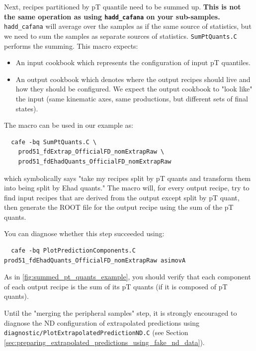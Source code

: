 \documentclass{article}
\begin{document}
Next, recipes partitioned by pT quantile need to be summed up. \textbf{This is not the same operation as using \texttt{hadd\_cafana} on your sub-samples.} \texttt{hadd\_cafana} will average over the samples as if the same source of statistics, but we need to sum the samples as separate sources of statistics.
\texttt{SumPtQuants.C} performs the summing. This macro expects:
\begin{itemize}
  \item An input cookbook which represents the configuration of input pT quantiles.
  \item An output cookbook which denotes where the output recipes should live and how they should be configured. We expect the output cookbook to "look like" the input (same kinematic axes, same productions, but different sets of final states).
\end{itemize}
The macro can be used in our example as:
\begin{verbatim}
  cafe -bq SumPtQuants.C \
    prod51_fdExtrap_OfficialFD_nomExtrapRaw \
    prod51_fdEhadQuants_OfficialFD_nomExtrapRaw
\end{verbatim}
which symbolically says "take my recipes split by pT quants and transform them into being split by Ehad quants." The macro will, for every output recipe, try to find input recipes that are derived from the output except split by pT quant, then generate the ROOT file for the output recipe using the sum of the pT quants.

You can diagnose whether this step succeeded using:
\begin{verbatim}
  cafe -bq PlotPredictionComponents.C prod51_fdEhadQuants_OfficialFD_nomExtrapRaw asimovA
\end{verbatim}
As in \ref{fig:summed_pt_quants_example}, you should verify that each component of each output recipe is the sum of its pT quants (if it is composed of pT quants).

Until the "merging the peripheral samples" step, it is strongly encouraged to diagnose the ND configuration of extrapolated predictions using \texttt{diagnostic/Plot\-Extrapolated\-Prediction\-ND\-.C} (see Section \ref{sec:preparing_extrapolated_predictions_using_fake_nd_data}).
\end{document}
